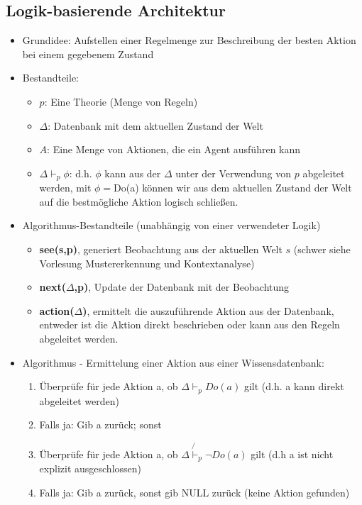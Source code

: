 \documentclass{article} %
\begin{document}
	\subsection{Logik-basierende Architektur}
	\begin{itemize}
		\item Grundidee: Aufstellen einer Regelmenge zur Beschreibung der besten Aktion bei einem gegebenem Zustand
		\item Bestandteile:
		\begin{itemize}
			\item $p$: Eine Theorie (Menge von Regeln)
			\item $\Delta$: Datenbank mit dem aktuellen Zustand der Welt
			\item $A$: Eine Menge von Aktionen, die ein Agent ausführen kann
			\item $\Delta\vdash_{p}\phi$: d.h. $\phi$ kann aus der $\Delta$ unter der Verwendung von $p$ abgeleitet werden, mit $\phi=$Do(a) können wir aus dem aktuellen Zustand der Welt auf die bestmögliche Aktion logisch schließen.
		\end{itemize}
		 \item Algorithmus-Bestandteile (unabhängig von einer verwendeter Logik)
		 \begin{itemize}
		 	\item \textbf{see(s,p)}, generiert Beobachtung aus der aktuellen Welt $s$ (schwer siehe Vorlesung Mustererkennung und Kontextanalyse)
		 	\item \textbf{next($\Delta$,p)}, Update der Datenbank mit der Beobachtung
		 	\item \textbf{action($\Delta$)}, ermittelt die auszuführende Aktion aus der Datenbank, entweder ist die Aktion direkt beschrieben oder kann aus den Regeln abgeleitet werden.
		 \end{itemize}
		 \item Algorithmus - Ermittelung einer Aktion aus einer Wissensdatenbank:
		 \begin{enumerate}
		 	\item Überprüfe für jede Aktion a, ob  $\Delta\vdash_{p}Do(a)$ gilt (d.h. a kann direkt abgeleitet werden)
		 	\item Falls ja: Gib a zurück; sonst
		 	\item Überprüfe für jede Aktion a, ob $\Delta\not{\vdash}_{p}\neg Do(a)$ gilt (d.h a ist nicht explizit ausgeschlossen)
		 	\item Falls ja: Gib a zurück, sonst gib NULL zurück (keine Aktion gefunden)
		 \end{enumerate}
	\end{itemize}
\end{document}
